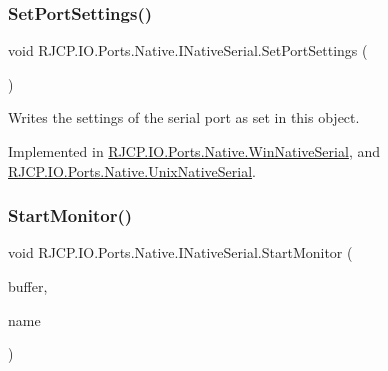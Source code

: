 \mbox{\label{interface_r_j_c_p_1_1_i_o_1_1_ports_1_1_native_1_1_i_native_serial_a56ae928a722facd5c4a885eee8c72455}} 
\subsubsection{\texorpdfstring{SetPortSettings()}{SetPortSettings()}}
{\footnotesize\ttfamily void R\+J\+C\+P.\+I\+O.\+Ports.\+Native.\+I\+Native\+Serial.\+Set\+Port\+Settings (\begin{DoxyParamCaption}{ }\end{DoxyParamCaption})}



Writes the settings of the serial port as set in this object. 



Implemented in \mbox{\hyperlink{class_r_j_c_p_1_1_i_o_1_1_ports_1_1_native_1_1_win_native_serial_a662e00be7fe361aa0d49fb8530721f91}{R\+J\+C\+P.\+I\+O.\+Ports.\+Native.\+Win\+Native\+Serial}}, and \mbox{\hyperlink{class_r_j_c_p_1_1_i_o_1_1_ports_1_1_native_1_1_unix_native_serial_a9d3928485a0b39df2c5d72f17036b4eb}{R\+J\+C\+P.\+I\+O.\+Ports.\+Native.\+Unix\+Native\+Serial}}.

\mbox{\label{interface_r_j_c_p_1_1_i_o_1_1_ports_1_1_native_1_1_i_native_serial_a64481becda92f402e2eb7728ceb9de06}} 
\subsubsection{\texorpdfstring{StartMonitor()}{StartMonitor()}}
{\footnotesize\ttfamily void R\+J\+C\+P.\+I\+O.\+Ports.\+Native.\+I\+Native\+Serial.\+Start\+Monitor (\begin{DoxyParamCaption}\item[{\mbox{\hyperlink{class_r_j_c_p_1_1_i_o_1_1_ports_1_1_native_1_1_serial_buffer}{Serial\+Buffer}}}]{buffer,  }\item[{string}]{name }\end{DoxyParamCaption})}



